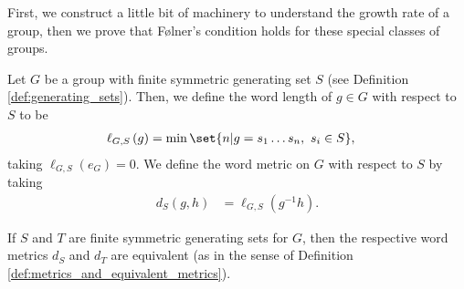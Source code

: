 First, we construct a little bit of machinery to understand the growth rate of a group, then we prove that Følner's condition holds for these special classes of groups.
\begin{definition}\label{def:word_metric}
  Let $G$ be a group with finite symmetric generating set $S$ (see Definition \ref{def:generating_sets}). Then, we define the word length of $g\in G$ with respect to $S$ to be
  \begin{align*}
    \ell_{G,S}\left(g\right) &= \min\set{n | g = s_1\dots s_n,~s_i\in S},
  \end{align*}
  taking $\ell_{G,S}\left(e_G\right) = 0$. We define the word metric on $G$ with respect to $S$ by taking
  \begin{align*}
    d_{S}\left(g,h\right) &= \ell_{G,S}\left(g^{-1}h\right).
  \end{align*}
\end{definition}
\begin{fact}\label{fact:word_metric_equivalent_metrics}
  If $S$ and $T$ are finite symmetric generating sets for $G$, then the respective word metrics $d_{S}$ and $d_{T}$ are equivalent (as in the sense of Definition \ref{def:metrics_and_equivalent_metrics}).
\end{fact}
